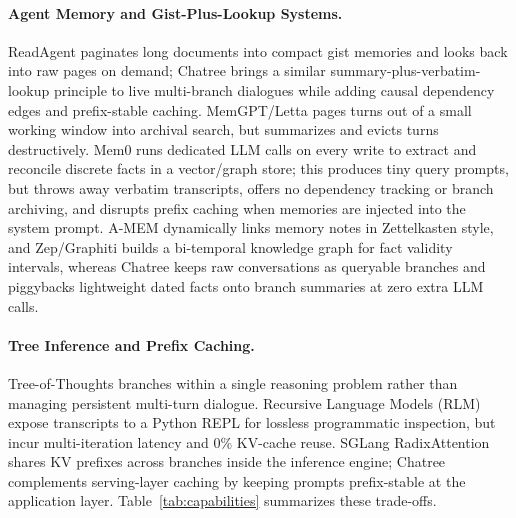 \documentclass[10pt,twocolumn]{article}
\begin{document}
\paragraph{Agent Memory and Gist-Plus-Lookup Systems.}
ReadAgent \citep{lee2024readagent} paginates long documents into compact gist memories and looks back into raw pages on demand; Chatree brings a similar summary-plus-verbatim-lookup principle to live multi-branch dialogues while adding causal dependency edges and prefix-stable caching. MemGPT/Letta \citep{packer2023memgpt} pages turns out of a small working window into archival search, but summarizes and evicts turns destructively. Mem0 \citep{chhikara2025mem0} runs dedicated LLM calls on every write to extract and reconcile discrete facts in a vector/graph store; this produces tiny query prompts, but throws away verbatim transcripts, offers no dependency tracking or branch archiving, and disrupts prefix caching when memories are injected into the system prompt. A-MEM \citep{xu2025amem} dynamically links memory notes in Zettelkasten style, and Zep/Graphiti \citep{rasmussen2025zep} builds a bi-temporal knowledge graph for fact validity intervals, whereas Chatree keeps raw conversations as queryable branches and piggybacks lightweight dated facts onto branch summaries at zero extra LLM calls.

\paragraph{Tree Inference and Prefix Caching.}
Tree-of-Thoughts \citep{yao2023tot} branches within a single reasoning problem rather than managing persistent multi-turn dialogue. Recursive Language Models (RLM) \citep{zhang2025rlm} expose transcripts to a Python REPL for lossless programmatic inspection, but incur multi-iteration latency and 0\% KV-cache reuse. SGLang RadixAttention \citep{zheng2024sglang} shares KV prefixes across branches inside the inference engine; Chatree complements serving-layer caching by keeping prompts prefix-stable at the application layer. Table~\ref{tab:capabilities} summarizes these trade-offs.
\end{document}
